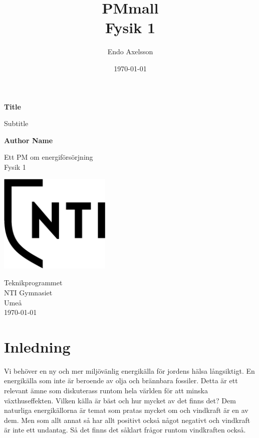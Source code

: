 \documentclass[11p]{article}
\title{PMmall \\ \small Fysik 1}
\author{Endo Axelsson }
\date{\today}
\begin{document}
    \begin{titlepage}
        \begin{center}
            \vspace*{1cm}

            \Huge
            \textbf{Title}

            \vspace{0.5cm}
            \LARGE
            Subtitle

            \vspace{1.5cm}

            \textbf{Author Name}

            \vfill

            Ett PM om energiförsörjning \\
            Fysik 1

            \vspace{0.8cm}

            \includegraphics[width=0.4\textwidth]{../images/NTI Gymnasiet_Symbol_print_svart.png}

            \Large
            Teknikprogrammet\\
            NTI Gymnasiet\\
            Umeå\\
            \today

        \end{center}
    \end{titlepage}
    \tableofcontents
    \newpage

    \section{Inledning}
    Vi behöver en ny och mer miljövänlig energikälla för jordens hälsa långsiktigt.
    En energikälla som inte är  beroende av olja och brännbara fossiler.
    Detta är ett relevant ämne som diskuterass runtom hela världen för att minska växthuseffekten.
    Vilken källa är bäst och hur mycket av det finns det?
    Dem naturliga energikällorna är temat som pratas mycket om och vindkraft är en av dem.
    Men som allt annat så har allt positivt också något negativt och vindkraft är inte ett undantag.
    Så det finns det såklart frågor runtom vindkraften också.
\end{document}
